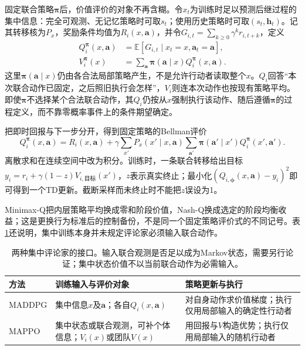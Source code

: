 固定联合策略$\bm\pi$后，价值评价的对象不再含糊。令$x_t$为训练时足以预测后继过程的集中信息：完全可观测、无记忆策略时可取$s_t$；使用历史策略时可取$(s_t,\bm h_t)$。记其转移核为$P_x$，奖励条件均值为$R_i(x,\bm a)$，并令$G_{i,t}=\sum_{k\geq0}\gamma^k r_{i,t+k}$，定义
\begin{align}
 Q_i^{\bm\pi}(x,\bm a)
 &=\mathbb E[G_{i,t}\mid x_t=x,\bm a_t=\bm a],\\
 V_i^{\bm\pi}(x)
 &=\sum_{\bm a}\bm\pi(\bm a\mid x)Q_i^{\bm\pi}(x,\bm a).
\end{align}
这里$\bm\pi(\bm a\mid x)$仍由各合法局部策略产生，不是允许行动者读取整个$x$。$Q_i$回答“本次联合动作已固定，之后照旧执行会怎样”，$V_i$则连本次动作也按现有策略平均。即使$\bm\pi$不选择某个合法联合动作，其$Q_i$仍按从$x$强制执行该动作、随后遵循$\bm\pi$的过程定义，而不靠零概率事件上的条件期望确定。

把即时回报与下一步分开，得到固定策略的Bellman评价
\begin{equation}
 Q_i^{\bm\pi}(x,\bm a)=R_i(x,\bm a)+
 \gamma\sum_{x'}P_x(x'\mid x,\bm a)
       \sum_{\bm a'}\bm\pi(\bm a'\mid x')Q_i^{\bm\pi}(x',\bm a').
 \label{eq:rl-multi-agent-joint-bellman}
\end{equation}
离散求和在连续空间中改为积分。训练时，一条联合转移给出目标
$y_i=r_i+\gamma(1-z)V_{i,\text{目标}}(x')$，$z$表示真实终止；最小化$(Q_{i,\bm\phi}(x,\bm a)-y_i)^2$即可得到一个TD更新。截断采样而未终止时不能把$z$误设为1。

Minimax-Q把内层策略平均换成零和阶段价值，Nash-Q换成选定的阶段均衡收益；这是更换行为标准后的控制备份，不是同一个固定策略评价式的不同记号。表\ref{tab:rl-multi-agent-critics}还说明，集中训练本身并未规定评论家必须输入联合动作。

\begin{table}[htbp]
 \centering
 \begin{tabularx}{\linewidth}{@{}l >{\raggedright\arraybackslash}X >{\raggedright\arraybackslash}X@{}}
 \toprule
 方法 & 训练输入与评价对象 & 策略更新与执行\\
 \midrule
 MADDPG & 集中信息$x$及$\bm a$；各自$Q_i(x,\bm a)$ & 对自身动作求价值梯度；执行仅用局部输入的确定性行动者\\
 MAPPO & 集中状态或联合观测，可补个体信息；$V_i(x)$或团队$V(x)$ & 用回报与$V$构造优势；执行仅用局部输入的随机行动者\\
 \bottomrule
 \end{tabularx}
 \caption{两种集中评论家的接口。输入联合观测是否足以成为Markov状态，需要另行论证；集中状态价值不以当前联合动作为必需输入。}
 \label{tab:rl-multi-agent-critics}
\end{table}

